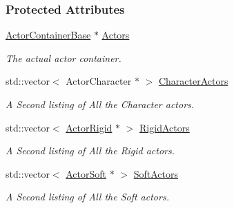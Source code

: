 \subsubsection*{Protected Attributes}
\begin{DoxyCompactItemize}
\item 
\hypertarget{classphys_1_1ActorManager_a7e6b7f66bdcf78475a2b07f8acac0418}{
\hyperlink{classphys_1_1ActorContainerBase}{ActorContainerBase} $\ast$ \hyperlink{classphys_1_1ActorManager_a7e6b7f66bdcf78475a2b07f8acac0418}{Actors}}
\label{classphys_1_1ActorManager_a7e6b7f66bdcf78475a2b07f8acac0418}

\begin{DoxyCompactList}\small\item\em The actual actor container. \item\end{DoxyCompactList}\item 
\hypertarget{classphys_1_1ActorManager_a3c2d7fb69bc1573182dd13c598a56c4f}{
std::vector$<$ ActorCharacter $\ast$ $>$ \hyperlink{classphys_1_1ActorManager_a3c2d7fb69bc1573182dd13c598a56c4f}{CharacterActors}}
\label{classphys_1_1ActorManager_a3c2d7fb69bc1573182dd13c598a56c4f}

\begin{DoxyCompactList}\small\item\em A Second listing of All the Character actors. \item\end{DoxyCompactList}\item 
\hypertarget{classphys_1_1ActorManager_aeef3741b00d08ab6a51ba2962429ba4d}{
std::vector$<$ \hyperlink{classphys_1_1ActorRigid}{ActorRigid} $\ast$ $>$ \hyperlink{classphys_1_1ActorManager_aeef3741b00d08ab6a51ba2962429ba4d}{RigidActors}}
\label{classphys_1_1ActorManager_aeef3741b00d08ab6a51ba2962429ba4d}

\begin{DoxyCompactList}\small\item\em A Second listing of All the Rigid actors. \item\end{DoxyCompactList}\item 
\hypertarget{classphys_1_1ActorManager_a36ceb34508b78c5c13cba1dfc833b0f4}{
std::vector$<$ \hyperlink{classphys_1_1ActorSoft}{ActorSoft} $\ast$ $>$ \hyperlink{classphys_1_1ActorManager_a36ceb34508b78c5c13cba1dfc833b0f4}{SoftActors}}
\label{classphys_1_1ActorManager_a36ceb34508b78c5c13cba1dfc833b0f4}

\begin{DoxyCompactList}\small\item\em A Second listing of All the Soft actors. \item\end{DoxyCompactList}\end{DoxyCompactItemize}


